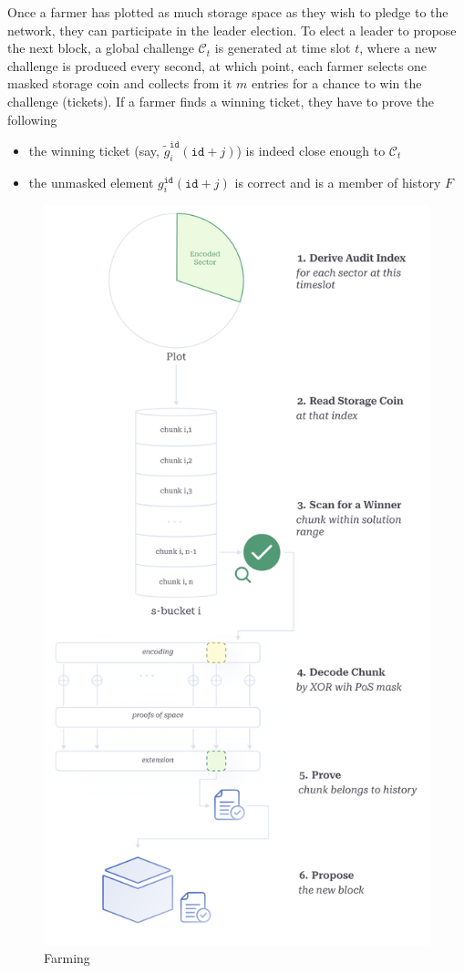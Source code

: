 \documentclass[conference]{IEEEtran}
\newcommand{\id}{\texttt{id}}
\begin{document}
Once a farmer has plotted as much storage space as they wish to pledge to the network, they can participate in the leader election. To elect a leader to propose the next block, a global challenge $\mathcal{C}_t$ is generated at time slot $t$, where a new challenge is produced every second, at which point, each farmer selects one masked storage coin and collects from it $m$ entries for a chance to win the challenge (tickets). If a farmer finds a winning ticket, they have to prove the following
\begin{itemize}
    \item the winning ticket (say, $\tilde{g}_i^{\id}(\id + j)$) is indeed close enough to $\mathcal{C}_t$
    \item the unmasked element ${g}_i^{\id}(\id + j)$ is correct and is a member of history $F$
\end{itemize}
\begin{figure}
    \centering
    \includegraphics[width=1\linewidth]{farming.png}
\caption{Farming}
\label{fig:farming}
\end{figure}
\end{document}
